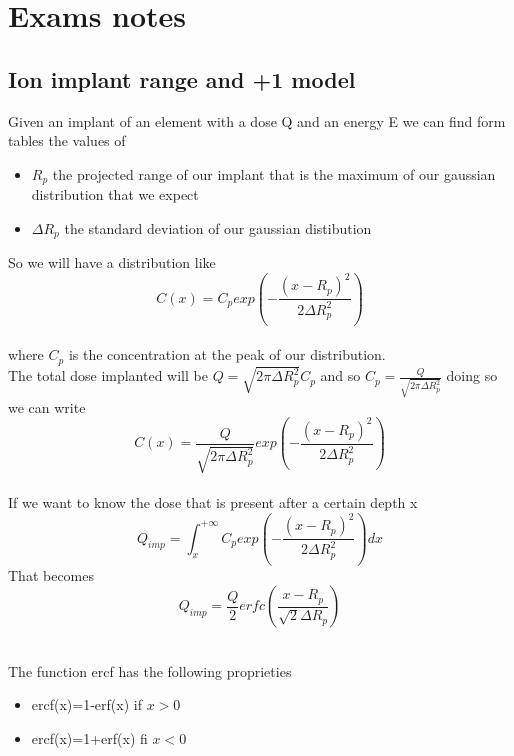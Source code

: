 \chapter{Exams notes}

\section{Ion implant range and +1 model}
Given an implant of an element with a dose Q and an energy E we can find form tables the values of 
    \begin{itemize}
    \item $R_p$ the projected range of our implant that is the maximum of our gaussian distribution that we expect
    \item $\Delta R_p$ the standard deviation of our gaussian distibution
    \end{itemize}
So we will have a distribution like 
\begin{equation}
C(x)=C_p exp\left(-\frac{(x-R_p)^2}{2\Delta R_p^2}\right)
\end{equation}
\\
where $C_p$ is the concentration at the peak of our distribution.\\
The total dose implanted will be $Q=\sqrt{2\pi\Delta R_p^2} C_p$ and so $C_p=\frac{Q}{\sqrt{2\pi\Delta R_p^2}}$ doing so we can write
\begin{equation}
C(x)=\frac{Q}{\sqrt{2\pi\Delta R_p^2}}exp\left(-\frac{(x-R_p)^2}{2\Delta R_p^2}\right)
\end{equation}
\\

If we want to know the dose that is present after a certain depth x
\begin{equation}
Q_{imp}=\int_x^{+\infty}C_p exp\left(-\frac{(x-R_p)^2}{2\Delta R_p^2}\right) dx
\end{equation}
That becomes 
\begin{equation}
Q_{imp}=\frac{Q}{2}erfc\left(\frac{x-R_p}{\sqrt{2}\Delta R_p}\right)
\end{equation}
\\
\vspace{5mm}

The function ercf has the following proprieties 
\begin{itemize}
\item ercf(x)=1-erf(x) if $x>0$
\item ercf(x)=1+erf(x) fi $x<0$
\end{itemize}

